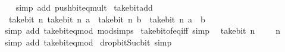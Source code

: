 \begin{isabellebody}
%
\isadelimproof
\ \ %
\endisadelimproof
%
\isatagproof
{}\isamarkupfalse%
\ {\isacharparenleft}{\kern0pt}simp\ add{\isacharcolon}{\kern0pt}\ push{\isacharunderscore}{\kern0pt}bit{\isacharunderscore}{\kern0pt}eq{\isacharunderscore}{\kern0pt}mult{\isacharparenright}{\kern0pt}%
\endisatagproof
{\isafoldproof}%
%
\isadelimproof
\isanewline
%
\endisadelimproof
\isanewline
{}\isamarkupfalse%
\ take{\isacharunderscore}{\kern0pt}bit{\isacharunderscore}{\kern0pt}add{\isacharcolon}{\kern0pt}\isanewline
\ \ {\isachardoublequoteopen}take{\isacharunderscore}{\kern0pt}bit\ n\ {\isacharparenleft}{\kern0pt}take{\isacharunderscore}{\kern0pt}bit\ n\ a\ {\isacharplus}{\kern0pt}\ take{\isacharunderscore}{\kern0pt}bit\ n\ b{\isacharparenright}{\kern0pt}\ {\isacharequal}{\kern0pt}\ take{\isacharunderscore}{\kern0pt}bit\ n\ {\isacharparenleft}{\kern0pt}a\ {\isacharplus}{\kern0pt}\ b{\isacharparenright}{\kern0pt}{\isachardoublequoteclose}\isanewline
%
\isadelimproof
\ \ %
\endisadelimproof
%
\isatagproof
{}\isamarkupfalse%
\ {\isacharparenleft}{\kern0pt}simp\ add{\isacharcolon}{\kern0pt}\ take{\isacharunderscore}{\kern0pt}bit{\isacharunderscore}{\kern0pt}eq{\isacharunderscore}{\kern0pt}mod\ mod{\isacharunderscore}{\kern0pt}simps{\isacharparenright}{\kern0pt}%
\endisatagproof
{\isafoldproof}%
%
\isadelimproof
\isanewline
%
\endisadelimproof
\isanewline
{}\isamarkupfalse%
\ take{\isacharunderscore}{\kern0pt}bit{\isacharunderscore}{\kern0pt}of{\isacharunderscore}{\kern0pt}{}{\isacharunderscore}{\kern0pt}eq{\isacharunderscore}{\kern0pt}{}{\isacharunderscore}{\kern0pt}iff\ {\isacharbrackleft}{\kern0pt}simp{\isacharbrackright}{\kern0pt}{\isacharcolon}{\kern0pt}\isanewline
\ \ {\isachardoublequoteopen}take{\isacharunderscore}{\kern0pt}bit\ n\ {}\ {\isacharequal}{\kern0pt}\ {}\ {\isasymlongleftrightarrow}\ n\ {\isacharequal}{\kern0pt}\ {}{\isachardoublequoteclose}\isanewline
%
\isadelimproof
\ \ %
\endisadelimproof
%
\isatagproof
{}\isamarkupfalse%
\ {\isacharparenleft}{\kern0pt}simp\ add{\isacharcolon}{\kern0pt}\ take{\isacharunderscore}{\kern0pt}bit{\isacharunderscore}{\kern0pt}eq{\isacharunderscore}{\kern0pt}mod{\isacharparenright}{\kern0pt}%
\endisatagproof
{\isafoldproof}%
%
\isadelimproof
\isanewline
%
\endisadelimproof
\isanewline
{}\isamarkupfalse%
\ drop{\isacharunderscore}{\kern0pt}bit{\isacharunderscore}{\kern0pt}Suc{\isacharunderscore}{\kern0pt}bit{}\ {\isacharbrackleft}{\kern0pt}simp{\isacharbrackright}{\kern0pt}{\isacharcolon}{\kern0pt}\isanewline

\end{isabellebody}
